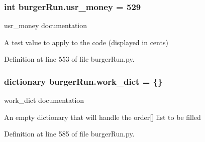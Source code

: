 \hypertarget{namespaceburgerRun_a88ac18f8f56f6e59051d7fb1306df577}{
\subsubsection[{usr\-\_\-money}]{\setlength{\rightskip}{0pt plus 5cm}int burger\-Run.\-usr\-\_\-money = 529}}\label{namespaceburgerRun_a88ac18f8f56f6e59051d7fb1306df577}


usr\-\_\-money documentation 

A test value to apply to the code (displayed in cents) 

Definition at line 553 of file burger\-Run.\-py.

\hypertarget{namespaceburgerRun_abf3d7cafbc3c364795ee87262ca817ae}{
\subsubsection[{work\-\_\-dict}]{\setlength{\rightskip}{0pt plus 5cm}dictionary burger\-Run.\-work\-\_\-dict = \{\}}}\label{namespaceburgerRun_abf3d7cafbc3c364795ee87262ca817ae}


work\-\_\-dict documentation 

An empty dictionary that will handle the order\mbox{[}\mbox{]} list to be filled 

Definition at line 585 of file burger\-Run.\-py.


